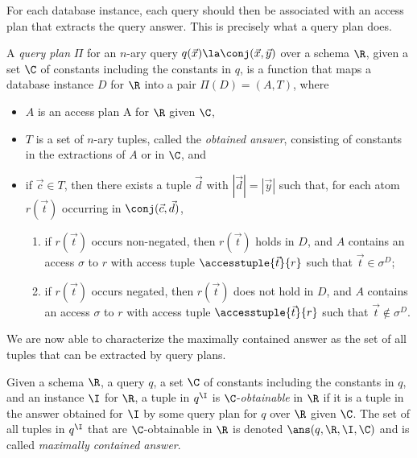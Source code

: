 For each database instance, each query should then be associated with an access plan that extracts the query answer. This is precisely what a query plan does.

\begin{definition}\label{def:query-plan}
A \emph{query plan} $\Pi$ for an $n$-ary query $q(\vec x)\la \conj(\vec x,\vec y)$ over a schema $\R$, given a set $\C$ of constants including the constants in $q$, is a function that maps a database instance $D$ for $\R$ into a pair $\Pi(D)=(A,T)$, where
\begin{itemize}
    \item $A$ is an access plan A for $\R$ given $\C$,
    \item $T$ is a set of $n$-ary tuples, called the \emph{obtained answer}, consisting of constants in the extractions of $A$ or in $\C$, and
    \item if $\vec c\in T$, then there exists a tuple $\vec d$ with $|\vec d|=|\vec y|$ such that, for each atom $r(\vec t)$ occurring in $\conj(\vec c,\vec d)$,
    \begin{enumerate}
	    \item if $r(\vec t)$ occurs non-negated, then $r(\vec t)$ holds in $D$, and $A$ contains an access $\sigma$ to $r$ with access tuple $\accesstuple{\vec t}{r}$ such that $\vec t\in\sigma^D$;
	    \item if $r(\vec t)$ occurs negated, then $r(\vec t)$ does not hold in $D$, and $A$ contains an access $\sigma$ to $r$ with access tuple $\accesstuple{\vec t}{r}$ such that $\vec t\not\in\sigma^D$.
    \end{enumerate}
\end{itemize}
\end{definition}

We are now able to characterize the maximally contained answer as the set of all tuples that can be extracted by query plans.

\begin{definition}\label{def:maximal-answer}
Given a schema $\R$, a query $q$, a set $\C$ of constants including the constants in $q$, and an instance $\I$ for $\R$, a tuple in $q^\I$ is $\C$-\emph{obtainable} in $\R$ if it is a tuple in the answer obtained for $\I$ by some query plan for $q$ over $\R$ given $\C$.
The set of all tuples in $q^\I$ that are $\C$-obtainable in $\R$ is denoted $\ans(q,\R,\I,\C)$ and is called \emph{maximally contained answer}.
\end{definition}

